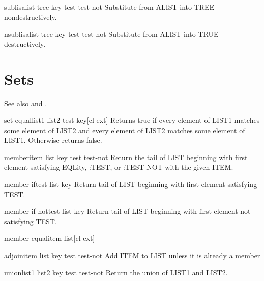 \documentclass[10pt,english]{book}
\begin{document}
\begin{function}{sublis}{alist tree \key key test test-not}
  Substitute from ALIST into TREE nondestructively.
\end{function}

\begin{function}{nsublis}{alist tree \key key test test-not}
  Substitute from ALIST into TRUE destructively.
\end{function}

\section{Sets}
\label{sec:sets}

See also  and .

\begin{function}{set-equal}{list1 list2 \key test key}[cl-ext]
  Returns true if every element of LIST1 matches some element of LIST2 and
every element of LIST2 matches some element of LIST1. Otherwise returns false.
\end{function}

\begin{function}{member}{item list \key key test test-not}
  Return the tail of LIST beginning with first element satisfying EQLity,
   :TEST, or :TEST-NOT with the given ITEM.
\end{function}

\begin{function}{member-if}{test list \key key}
  Return tail of LIST beginning with first element satisfying TEST.
\end{function}

\begin{function}{member-if-not}{test list \key key}
  Return tail of LIST beginning with first element not satisfying TEST.
\end{function}

\begin{function}{member-equal}{item list}[cl-ext]
  
\end{function}

\begin{function}{adjoin}{item list \key key test test-not}
  Add ITEM to LIST unless it is already a member
\end{function}

\begin{function}{union}{list1 list2 \key key test test-not}
  Return the union of LIST1 and LIST2.
\end{function}
\end{document}
